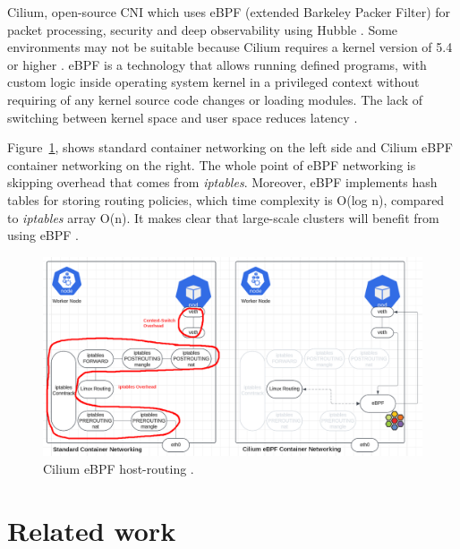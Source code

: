 Cilium, open-source CNI which uses eBPF (extended Barkeley Packer Filter) for packet processing, security and deep observability using Hubble \cite{CiliumDocs}. Some environments may not be suitable because Cilium requires a kernel version of 5.4 or higher \cite{CiliumDocs}. eBPF is a technology that allows running defined programs, with custom logic inside operating system kernel in a privileged context without requiring of any kernel source code changes or loading modules. The lack of switching between kernel space and user space reduces latency \cite{eBPF}. 

Figure~\ref{fig:ebpf_routing}, shows standard container networking on the left side and Cilium eBPF container networking on the right. The whole point of eBPF networking is skipping overhead that comes from \textit{iptables}. Moreover, eBPF implements hash tables for storing routing policies, which time complexity is O(log n), compared to \textit{iptables} array O(n). It makes clear that large-scale clusters will benefit from using eBPF \cite{IsovalentHash}. 

\begin{figure}[H]
    \centering
    \includegraphics[width=0.9\columnwidth]{images/ebpf_hostrouting.png}
    \caption{Cilium eBPF host-routing \cite{CiliumCNIBenchmark}.}
    \label{fig:ebpf_routing}
\end{figure}




\section{Related work}
\label{sec:realted_work}

